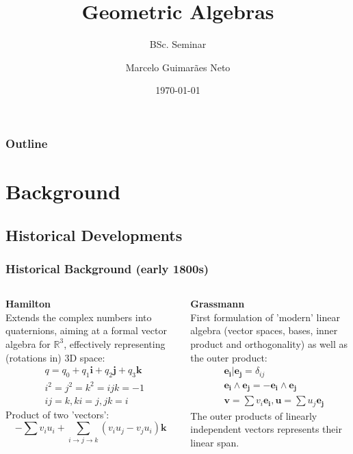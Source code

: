 \documentclass{beamer}
\title{Geometric Algebras}
\subtitle{BSc. Seminar}
\author{Marcelo Guimarães Neto}
\institute{University of Helsinki}
\date{\today}
\newcommand{\bv}[1]{\boldsymbol{#1}}
\begin{document}
\begin{frame}
\titlepage
\end{frame}

\begin{frame}
\frametitle{Outline}
\tableofcontents
\end{frame}

\section{Background}
 \subsection{Historical Developments}

\begin{frame}
\frametitle{Historical Background (early 1800s)}
\begin{columns}[T]
    \pause
    \textbf{Hamilton}\\
    Extends the complex numbers into quaternions, aiming at a formal vector algebra for $\mathbb{R}^3$, effectively representing (rotations in) 3D space:
    \begin{align*}
        &q = q_0 + q_1\boldsymbol{i} + q_2\boldsymbol{j} + q_3\boldsymbol{k}\\
        &i^2 = j^2 = k^2 = ijk = -1\\
        &ij = k, ki = j, jk = i
    \end{align*}
    Product of two 'vectors':
    \[-\sum v_iu_i + \sum_{i\to j\to k}(v_iu_j - v_ju_i)\boldsymbol{k}\]
  
    \pause
  
    \textbf{Grassmann}\\
    First formulation of 'modern' linear algebra (vector spaces, bases, inner product and orthogonality) as well as the outer product:
    \begin{align*}
        &\bv{e_i} | \bv{e_j} = \delta_{ij}\\
        &\bv{e_i}\wedge \bv{e_j} = -\bv{e_i}\wedge \bv{e_j}\\
        &\boldsymbol{v} = \sum v_i\boldsymbol{e_i}, \boldsymbol{u} = \sum u_j\boldsymbol{e_j}
    \end{align*}
    The outer products of linearly independent vectors represents their linear span.
\end{columns}
\end{frame}
\end{document}
